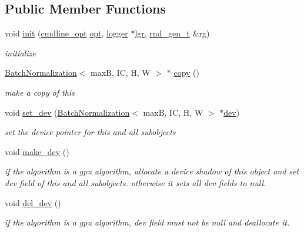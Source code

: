 \subsection*{Public Member Functions}
\begin{DoxyCompactItemize}
\item 
void \hyperlink{structBatchNormalization_aaf4e7179ded1be5c9284b9464cdde805}{init} (\hyperlink{structcmdline__opt}{cmdline\+\_\+opt} \hyperlink{structBatchNormalization_a9fb30ad9f94c91d4a4d4ab9d3801cba4}{opt}, \hyperlink{structlogger}{logger} $\ast$\hyperlink{structBatchNormalization_a160b18a54054d8afa967acc842dd9cf3}{lgr}, \hyperlink{structrnd__gen__t}{rnd\+\_\+gen\+\_\+t} \&rg)
\begin{DoxyCompactList}\small\item\em initialize \end{DoxyCompactList}\item 
\hyperlink{structBatchNormalization}{Batch\+Normalization}$<$ maxB, IC, H, W $>$ $\ast$ \hyperlink{structBatchNormalization_a328b3e1347324b4fec03662240f39aa5}{copy} ()
\begin{DoxyCompactList}\small\item\em make a copy of this \end{DoxyCompactList}\item 
void \hyperlink{structBatchNormalization_a05caf41d5a21914b07652d356fde7387}{set\+\_\+dev} (\hyperlink{structBatchNormalization}{Batch\+Normalization}$<$ maxB, IC, H, W $>$ $\ast$\hyperlink{structBatchNormalization_a86d66680b05689ca3df6297e3fd6598e}{dev})
\begin{DoxyCompactList}\small\item\em set the device pointer for this and all subobjects \end{DoxyCompactList}\item 
void \hyperlink{structBatchNormalization_a0d925e23b6e4d49e64319dd02d93b480}{make\+\_\+dev} ()
\begin{DoxyCompactList}\small\item\em if the algorithm is a gpu algorithm, allocate a device shadow of this object and set dev field of this and all subobjects. otherwise it sets all dev fields to null. \end{DoxyCompactList}\item 
void \hyperlink{structBatchNormalization_a3698340b540985a0cb1d5d2711fc8334}{del\+\_\+dev} ()
\begin{DoxyCompactList}\small\item\em if the algorithm is a gpu algorithm, dev field must not be null and deallocate it. \end{DoxyCompactList}\item 

\end{DoxyCompactItemize}
